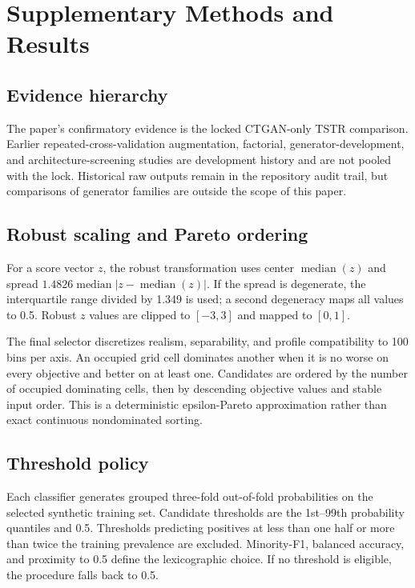 \section{Supplementary Methods and Results}
\label{app:audit}

\subsection{Evidence hierarchy}

The paper's confirmatory evidence is the locked CTGAN-only TSTR comparison. Earlier repeated-cross-validation augmentation, factorial, generator-development, and architecture-screening studies are development history and are not pooled with the lock. Historical raw outputs remain in the repository audit trail, but comparisons of generator families are outside the scope of this paper.

\subsection{Robust scaling and Pareto ordering}

For a score vector $z$, the robust transformation uses center $\operatorname{median}(z)$ and spread $1.4826\operatorname{median}|z-\operatorname{median}(z)|$. If the spread is degenerate, the interquartile range divided by 1.349 is used; a second degeneracy maps all values to 0.5. Robust $z$ values are clipped to $[-3,3]$ and mapped to $[0,1]$.

The final selector discretizes realism, separability, and profile compatibility to 100 bins per axis. An occupied grid cell dominates another when it is no worse on every objective and better on at least one. Candidates are ordered by the number of occupied dominating cells, then by descending objective values and stable input order. This is a deterministic epsilon-Pareto approximation rather than exact continuous nondominated sorting.

\subsection{Threshold policy}

Each classifier generates grouped three-fold out-of-fold probabilities on the selected synthetic training set. Candidate thresholds are the 1st--99th probability quantiles and 0.5. Thresholds predicting positives at less than one half or more than twice the training prevalence are excluded. Minority-F1, balanced accuracy, and proximity to 0.5 define the lexicographic choice. If no threshold is eligible, the procedure falls back to 0.5.

